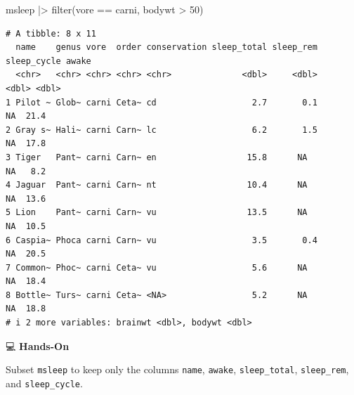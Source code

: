 \documentclass[
  letterpaper,
  DIV=11,
  numbers=noendperiod]{scrreprt}
\newenvironment{Shaded}{\begin{snugshade}}{\end{snugshade}}
\newcommand{\DecValTok}[1]{\textcolor[rgb]{0.68,0.00,0.00}{#1}}
\newcommand{\FunctionTok}[1]{\textcolor[rgb]{0.28,0.35,0.67}{#1}}
\newcommand{\NormalTok}[1]{\textcolor[rgb]{0.00,0.23,0.31}{#1}}
\newcommand{\SpecialCharTok}[1]{\textcolor[rgb]{0.37,0.37,0.37}{#1}}
\newcommand{\StringTok}[1]{\textcolor[rgb]{0.13,0.47,0.30}{#1}}
\begin{document}
\begin{tcolorbox}[enhanced jigsaw, colbacktitle=quarto-callout-tip-color!10!white, opacitybacktitle=0.6, breakable, left=2mm, leftrule=.75mm, toprule=.15mm, toptitle=1mm, bottomtitle=1mm, colframe=quarto-callout-tip-color-frame, opacityback=0, coltitle=black, arc=.35mm, titlerule=0mm, colback=white, bottomrule=.15mm, title=\textcolor{quarto-callout-tip-color}{\faLightbulb}\hspace{0.5em}{Answer}, rightrule=.15mm]

\begin{Shaded}
\begin{Highlighting}[]
\NormalTok{msleep }\SpecialCharTok{|\textgreater{}}
  \FunctionTok{filter}\NormalTok{(vore }\SpecialCharTok{==} \StringTok{\textquotesingle{}carni\textquotesingle{}}\NormalTok{, bodywt }\SpecialCharTok{\textgreater{}} \DecValTok{50}\NormalTok{)}
\end{Highlighting}
\end{Shaded}

\begin{verbatim}
# A tibble: 8 x 11
  name    genus vore  order conservation sleep_total sleep_rem sleep_cycle awake
  <chr>   <chr> <chr> <chr> <chr>              <dbl>     <dbl>       <dbl> <dbl>
1 Pilot ~ Glob~ carni Ceta~ cd                   2.7       0.1          NA  21.4
2 Gray s~ Hali~ carni Carn~ lc                   6.2       1.5          NA  17.8
3 Tiger   Pant~ carni Carn~ en                  15.8      NA            NA   8.2
4 Jaguar  Pant~ carni Carn~ nt                  10.4      NA            NA  13.6
5 Lion    Pant~ carni Carn~ vu                  13.5      NA            NA  10.5
6 Caspia~ Phoca carni Carn~ vu                   3.5       0.4          NA  20.5
7 Common~ Phoc~ carni Ceta~ vu                   5.6      NA            NA  18.4
8 Bottle~ Turs~ carni Ceta~ <NA>                 5.2      NA            NA  18.8
# i 2 more variables: brainwt <dbl>, bodywt <dbl>
\end{verbatim}

\end{tcolorbox}

💻 \textbf{Hands-On}

Subset \texttt{msleep} to keep only the columns \texttt{name},
\texttt{awake}, \texttt{sleep\_total}, \texttt{sleep\_rem}, and
\texttt{sleep\_cycle}.
\end{document}
